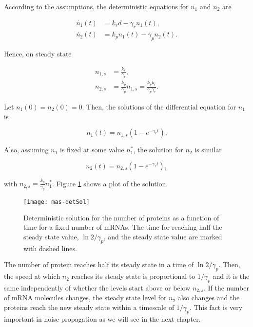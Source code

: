 According to the assumptions, the deterministic equations for $n_1$ and $n_2$ are

\begin{align}
  \dot{n_1}(t) &= k_rd-\gamma_rn_1(t)\label{eq:mas-simple_det_1},\\
  \dot{n_2}(t) &= k_pn_1(t)-\gamma_pn_2(t) \label{eq:mas-simple_det_2}.
\end{align}

Hence, on steady state


\begin{align}
   n_{1,s} &= \frac{k_r}{\gamma_r} \label{eq:mas-simple_ss_1}, \\
   n_{2,s} &= \frac{k_p}{\gamma_p} n_{1,s} = \frac{k_pk_r}{\gamma_p\gamma_r} \label{eq:mas-simple_ss_2}.
\end{align}

Let $n_1(0) = n_2(0) = 0$. Then, the solutions of the differential equation for $n_1$ is

\begin{equation*}
  n_1(t) = n_{1,s}\left(1-e^{-\gamma_rt}\right).
\end{equation*}

Also, assuming $n_1$ is fixed at some value $n_1^*$, the solution for $n_2$ is similar

\begin{equation*}
  n_2(t) = n_{2,s}\left(1-e^{-\gamma_rt}\right),
\end{equation*}

with $n_{2,s}=\frac{k_p}{\gamma_p}n_1^*$. Figure \ref{fig:mas-detSol} shows a plot of the solution.

\begin{figure}[H]
  \centering
  \texttt{[image: mas-detSol]}
  \caption[Deterministic solution for the number of proteins]{\label{fig:mas-detSol} Deterministic solution for the number of proteins as a function of time for a fixed number of mRNAs. The time for reaching half the steady state value, $\ln 2/\gamma_p$, and the steady state value are marked with dashed lines.}
\end{figure}

The number of protein reaches half its steady state in a time of $\ln 2/\gamma_p$. Then, the speed at which $n_2$ reaches its steady state is proportional to $1/\gamma_p$ and it is the same independently of whether the levels start above or below $n_{2,s}$. If the number of mRNA molecules changes, the steady state level for $n_2$ also changes and the proteins reach the new steady state within a timescale of $1/\gamma_p$. This fact is very important in noise propagation as we will see in the next chapter.

